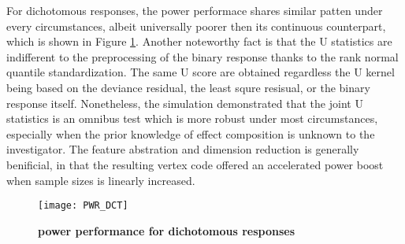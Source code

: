 For dichotomous responses, the power performace shares similar patten under every circumstances, albeit universally poorer then its continuous counterpart, which is shown in Figure \ref{fig:PWR_DCT}. Another noteworthy fact is that the U statistics are indifferent to the preprocessing of the binary response thanks to the rank normal quantile standardization. The same U score are obtained regardless the U kernel being based on the deviance residual, the least squre resisual, or the binary response itself.
Nonetheless, the simulation demonstrated that the joint U statistics is an omnibus test which is more robust under most circumstances, especially when the prior knowledge of effect composition is unknown to the investigator. The feature abstration and dimension reduction is generally benificial, in that the resulting vertex code offered an accelerated power boost when sample sizes is linearly increased.

\begin{figure}[h]
\centering
\texttt{[image: PWR\_DCT]}
\caption{\textbf{power performance for dichotomous responses}}
\label{fig:PWR_DCT}
\end{figure}

